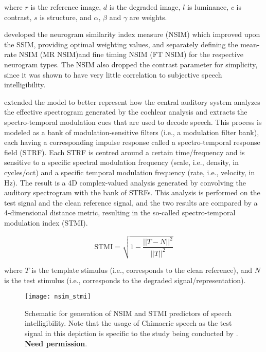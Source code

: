 \noindent
where $r$ is the reference image, $d$ is the degraded image, $l$ is luminance, $c$ is contrast, $s$ is structure, and $\alpha$, $\beta$ and $\gamma$ are weights.

\cite{hines2012speech} developed the neurogram similarity index measure (NSIM) which improved upon the SSIM, providing optimal weighting values, and separately defining the mean-rate NSIM (MR NSIM)and fine timing NSIM (FT NSIM) for the respective neurogram types. The NSIM also dropped the contrast parameter for simplicity, since it was shown to have very little correlation to subjective speech intelligibility.

\cite{zilany2007predictions} extended the model to better represent how the central auditory system analyzes the effective spectrogram generated by the cochlear analysis and extracts the spectro-temporal modulation cues that are used to decode speech. This process is modeled as a bank of modulation-sensitive filters (i.e., a modulation filter bank), each having a corresponding impulse response called a spectro-temporal response field (STRF). Each STRF is centred around a certain time/frequency and is sensitive to a specific spectral modulation frequency (scale, i.e., density, in cycles/oct) and a specific temporal modulation frequency (rate, i.e., velocity, in \unit{\hertz}). The result is a 4D complex-valued analysis generated by convolving the auditory spectrogram with the bank of STRFs. This analysis is performed on the test signal and the clean reference signal, and the two results are compared by a 4-dimensional distance metric, resulting in the so-called spectro-temporal modulation index (STMI).

\begin{equation}
	\mathrm{STMI}=\sqrt{1-\frac{||T-N||^2}{||T||^2}} \label{eq:STMI}
\end{equation}

\noindent
where $T$ is the template stimulus (i.e., corresponds to the clean reference), and $N$ is the test stimulus (i.e., corresponds to the degraded signal/representation).

\begin{figure}[H]
	\centering
	\texttt{[image: nsim\_stmi]}
	\caption[Schematic for generation of NSIM and STMI]{Schematic for generation of NSIM and STMI predictors of speech intelligibility. Note that the usage of Chimaeric speech as the test signal in this depiction is specific to the study being conducted by \citep{wirtzfeld2017predictions}. \textbf{Need permission}.}
	\label{fig:nsim_stmi}
\end{figure}

